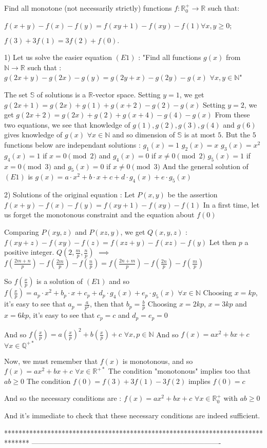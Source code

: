 \begin{solution}
	\begin{tcolorbox}Find all monotone (not necessarily strictly) functions $ f: \mathbb{R}^{ + }_0\rightarrow \mathbb{R}$ such that:

$ f(x + y) - f(x) - f(y) = f(xy + 1) - f(xy) - f(1) \forall x,y \ge 0$;

$ f(3) + 3f(1) = 3f(2) + f(0).$\end{tcolorbox}
1) Let us solve the easier equation $ (E1)$ :
"Find all functions $ g(x)$ from $ \mathbb N\to\mathbb R$ such that : $ g(2x+y)-g(2x)-g(y)=g(2y+x)-g(2y)-g(x)$ $ \forall x,y\in\mathbb N$"

The set $ \mathbb S$ of solutions is a $ \mathbb R$-vector space.
Setting $ y=1$, we get $ g(2x+1)=g(2x)+g(1)+g(x+2)-g(2)-g(x)$
Setting $ y=2$, we get $ g(2x+2)=g(2x)+g(2)+g(x+4)-g(4)-g(x)$
From these two equations, we see that knowledge of $ g(1),g(2),g(3),g(4)$ and $ g(6)$ gives knowledge of $ g(x)$ $ \forall x\in\mathbb N$ and so dimension of $ \mathbb S$ is at most $ 5$.
But the $ 5$ functions below are independant solutions :
$ g_1(x)=1$
$ g_2(x)=x$
$ g_3(x)=x^2$
$ g_4(x)=1$ if $ x=0\pmod 2$ and $ g_4(x)=0$ if $ x\neq 0\pmod 2$
$ g_5(x)=1$ if $ x=0\pmod 3$ and $ g_5(x)=0$ if $ x\neq 0\pmod 3$
And the general solution of $ (E1)$ is $ g(x)=a\cdot x^2+b\cdot x+c+d\cdot g_4(x)+e\cdot g_5(x)$

2) Solutions of the original equation :
Let $ P(x,y)$ be the assertion $ f(x+y)-f(x)-f(y)=f(xy+1)-f(xy)-f(1)$
In a first time, let us forget the monotonous constraint and the equation about $ f(0)$

Comparing $ P(xy,z)$ and $ P(xz,y)$, we get $ Q(x,y,z)$ : $ f(xy+z)-f(xy)-f(z)=f(xz+y)-f(xz)-f(y)$
Let then $ p$ a positive integer.
$ Q(2,\frac mp,\frac np)$ $ \implies$ $ f(\frac{2m+n}{p})-f(\frac{2m}{p})-f(\frac np)=f(\frac{2n+m}{p})-f(\frac{2n}{p})-f(\frac mp)$

So $ f(\frac xp)$ is a solution of $ (E1)$ and so $ f(\frac xp)=a_p\cdot x^2+b_p\cdot x+c_p+d_p\cdot g_4(x)+e_p\cdot g_5(x)$ $ \forall x\in\mathbb N$
Choosing $ x=kp$, it's easy to see that $ a_p=\frac{a}{p^2}$, then that $ b_p=\frac bp$
Choosing $ x=2kp$, $ x=3kp$ and $ x=6kp$, it's easy to see that $ c_p=c$ and $ d_p=e_p=0$

And so $ f(\frac xp)=a(\frac xp)^2+b(\frac xp)+c$ $ \forall x,p\in\mathbb N$
And so $ f(x)=ax^2+bx+c$ $ \forall x\in\mathbb Q^{+*}$

Now, we must remember that $ f(x)$ is monotonous, and so $ f(x)=ax^2+bx+c$ $ \forall x\in\mathbb R^{+*}$
The condition "monotonous" implies too that $ ab\geq 0$
The condition $ f(0)=f(3)+3f(1)-3f(2)$ implies $ f(0)=c$

And so the necessary conditions are :  $ \boxed{f(x)=ax^2+bx+c}$ $ \forall x\in\mathbb R_0^+$ with $ ab\geq 0$

And it's immediate to check that these necessary conditions are indeed sufficient.
\end{solution}
*******************************************************************************
-------------------------------------------------------------------------------

